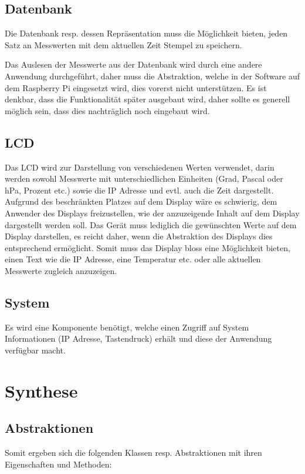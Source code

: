 \documentclass[
    10pt,
    a4paper,
]{scrartcl}
\begin{document}
\subsection{Datenbank}
Die Datenbank resp. dessen Repräsentation muss die Möglichkeit bieten, jeden Satz an
Messwerten mit dem aktuellen Zeit Stempel zu speichern.

Das Auslesen der Messwerte aus der Datenbank wird durch eine andere Anwendung
durchgeführt, daher muss die Abstraktion, welche in der Software auf dem Raspberry Pi
eingesetzt wird, dies vorerst nicht unterstützen. Es ist denkbar, dass die Funktionalität
später ausgebaut wird, daher sollte es generell möglich sein, dass dies nachträglich noch
eingebaut wird.

\subsection{LCD}
Das LCD wird zur Darstellung von verschiedenen Werten verwendet, darin werden sowohl
Messwerte mit unterschiedlichen Einheiten (Grad, Pascal oder hPa, Prozent etc.) sowie die
IP Adresse und evtl. auch die Zeit dargestellt. Aufgrund des beschränkten Platzes auf dem
Display wäre es schwierig, dem Anwender des Displays freizustellen, wie der anzuzeigende
Inhalt auf dem Display dargestellt werden soll. Das Gerät muss lediglich die gewünschten
Werte auf dem Display darstellen, es reicht daher, wenn die Abstraktion des Displays dies
entsprechend ermöglicht. Somit muss das Display bloss eine Möglichkeit bieten, einen Text
wie die IP Adresse, eine Temperatur etc. oder alle aktuellen Messwerte zugleich
anzuzeigen.

\subsection{System}
Es wird eine Komponente benötigt, welche einen Zugriff auf System Informationen (IP
Adresse, Tastendruck) erhält und diese der Anwendung verfügbar macht.

\section{Synthese}

\subsection{Abstraktionen}
Somit ergeben sich die folgenden Klassen resp. Abstraktionen mit ihren Eigenschaften und
Methoden:
\end{document}
